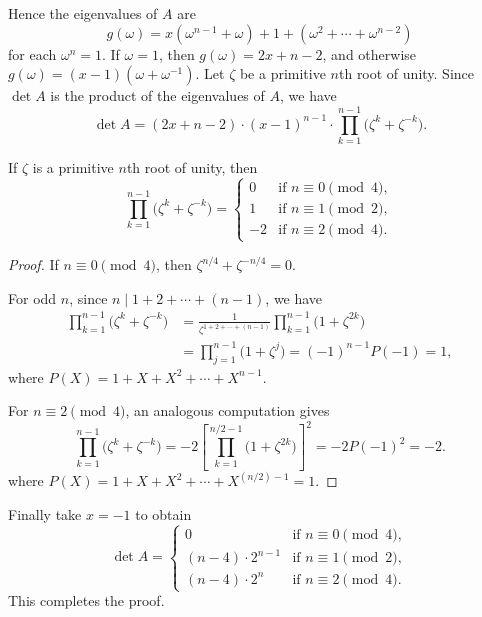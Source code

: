 Hence the eigenvalues of $A$ are \[g(\omega)=x(\omega^{n-1}+\omega)+1+(\omega^2+\cdots+\omega^{n-2})\]
for each $\omega^n=1$. If $\omega=1$, then $g(\omega)=2x+n-2$, and otherwise $g(\omega)=(x-1)(\omega+\omega^{-1})$. Let $\zeta$ be a primitive $n$th root of unity. Since $\det A$ is the product of the eigenvalues of $A$, we have \[\det A=(2x+n-2)\cdot(x-1)^{n-1}\cdot\prod_{k=1}^{n-1}\Big(\zeta^k+\zeta^{-k}\Big).\]
\begin{iclaim*}
    If $\zeta$ is a primitive $n$th root of unity, then \[\prod_{k=1}^{n-1}\Big(\zeta^k+\zeta^{-k}\Big)=\begin{cases}
            0&\text{if }n\equiv0\pmod4,\\
            1&\text{if }n\equiv1\pmod2,\\
            -2&\text{if }n\equiv2\pmod4.
    \end{cases}\]
\end{iclaim*}
\begin{proof}
    If $n\equiv0\pmod4$, then $\zeta^{n/4}+\zeta^{-n/4}=0$.

    For odd $n$, since $n\mid 1+2+\cdots+(n-1)$, we have
    \begin{align*}
        \prod_{k=1}^{n-1}\Big(\zeta^k+\zeta^{-k}\Big)&=\frac1{\zeta^{1+2+\cdots+(n-1)}}\prod_{k=1}^{n-1}\Big(1+\zeta^{2k}\Big)\\
        &=\prod_{j=1}^{n-1}\Big(1+\zeta^j\Big)
        =(-1)^{n-1}P(-1)=1,
    \end{align*}
    where $P(X)=1+X+X^2+\cdots+X^{n-1}$.

    For $n\equiv2\pmod4$, an analogous computation gives \[\prod_{k=1}^{n-1}\Big(\zeta^k+\zeta^{-k}\Big)=-2\left[\prod_{k=1}^{n/2-1}\Big(1+\zeta^{2k}\Big)\right]^2=-2P(-1)^2=-2.\]
    where $P(X)=1+X+X^2+\cdots+X^{(n/2)-1}=1$.
\end{proof}

Finally take $x=-1$ to obtain \[\det A=\begin{cases}
        0&\text{if }n\equiv0\pmod4,\\
        (n-4)\cdot2^{n-1}&\text{if }n\equiv1\pmod2,\\
        (n-4)\cdot2^n&\text{if }n\equiv2\pmod4.
\end{cases}\]
This completes the proof.


